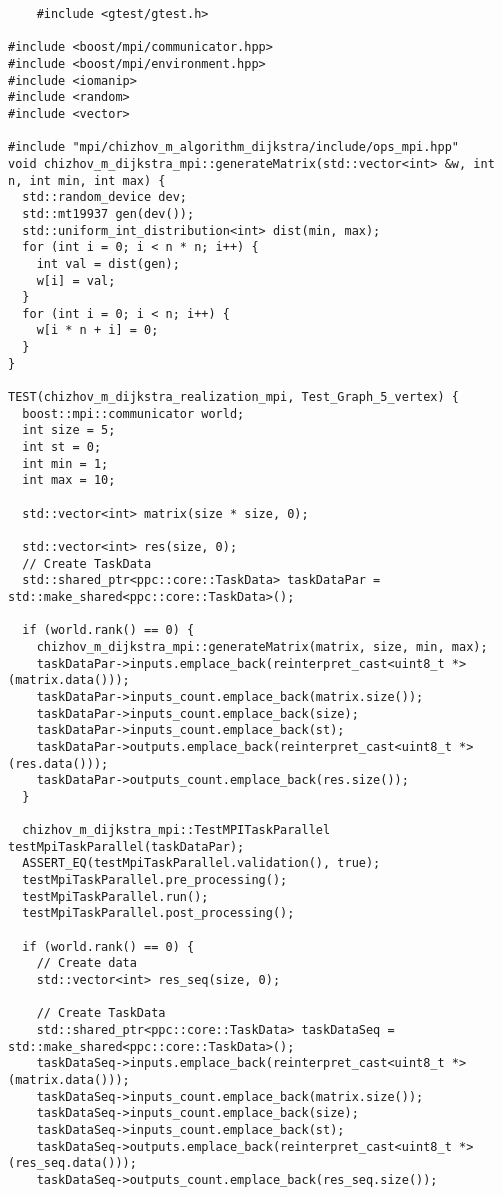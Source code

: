 \documentclass[a4paper, 14pt]{extarticle}
\begin{document}
\begin{lstlisting}
    #include <gtest/gtest.h>

#include <boost/mpi/communicator.hpp>
#include <boost/mpi/environment.hpp>
#include <iomanip>
#include <random>
#include <vector>

#include "mpi/chizhov_m_algorithm_dijkstra/include/ops_mpi.hpp"
void chizhov_m_dijkstra_mpi::generateMatrix(std::vector<int> &w, int n, int min, int max) {
  std::random_device dev;
  std::mt19937 gen(dev());
  std::uniform_int_distribution<int> dist(min, max);
  for (int i = 0; i < n * n; i++) {
    int val = dist(gen);
    w[i] = val;
  }
  for (int i = 0; i < n; i++) {
    w[i * n + i] = 0;
  }
}

TEST(chizhov_m_dijkstra_realization_mpi, Test_Graph_5_vertex) {
  boost::mpi::communicator world;
  int size = 5;
  int st = 0;
  int min = 1;
  int max = 10;

  std::vector<int> matrix(size * size, 0);

  std::vector<int> res(size, 0);
  // Create TaskData
  std::shared_ptr<ppc::core::TaskData> taskDataPar = std::make_shared<ppc::core::TaskData>();

  if (world.rank() == 0) {
    chizhov_m_dijkstra_mpi::generateMatrix(matrix, size, min, max);
    taskDataPar->inputs.emplace_back(reinterpret_cast<uint8_t *>(matrix.data()));
    taskDataPar->inputs_count.emplace_back(matrix.size());
    taskDataPar->inputs_count.emplace_back(size);
    taskDataPar->inputs_count.emplace_back(st);
    taskDataPar->outputs.emplace_back(reinterpret_cast<uint8_t *>(res.data()));
    taskDataPar->outputs_count.emplace_back(res.size());
  }

  chizhov_m_dijkstra_mpi::TestMPITaskParallel testMpiTaskParallel(taskDataPar);
  ASSERT_EQ(testMpiTaskParallel.validation(), true);
  testMpiTaskParallel.pre_processing();
  testMpiTaskParallel.run();
  testMpiTaskParallel.post_processing();

  if (world.rank() == 0) {
    // Create data
    std::vector<int> res_seq(size, 0);

    // Create TaskData
    std::shared_ptr<ppc::core::TaskData> taskDataSeq = std::make_shared<ppc::core::TaskData>();
    taskDataSeq->inputs.emplace_back(reinterpret_cast<uint8_t *>(matrix.data()));
    taskDataSeq->inputs_count.emplace_back(matrix.size());
    taskDataSeq->inputs_count.emplace_back(size);
    taskDataSeq->inputs_count.emplace_back(st);
    taskDataSeq->outputs.emplace_back(reinterpret_cast<uint8_t *>(res_seq.data()));
    taskDataSeq->outputs_count.emplace_back(res_seq.size());


\end{lstlisting}
\end{document}
